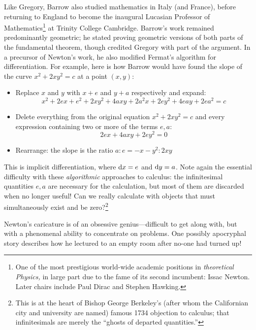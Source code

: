  Like Gregory, Barrow also studied mathematics in Italy (and France), before returning to England to become the inaugural Lucasian Professor of Mathematics\footnote{%
	One of the most prestigious world-wide academic positions in \emph{theoretical Physics,} in large part due to the fame of its second incumbent: Issac Newton. Later chairs include Paul Dirac and Stephen Hawking.%
}
at Trinity College Cambridge. Barrow's work remained predominantly geometric; he stated proving geometric versions of both parts of the fundamental theorem, though credited Gregory with part of the argument. In a precursor of Newton's work, he also modified Fermat's algorithm for differentiation. For example, here is how Barrow would have found the slope of the curve $x^2+2xy^2=c$ at a point $(x,y)$:
\begin{itemize}\itemsep0pt
  \item Replace $x$ and $y$ with $x+e$ and $y+a$ respectively and expand:
  \[
  	x^2+2ex+e^2+2xy^2+4axy+2a^2x+2ey^2+4eay+2ea^2=c
  \]
  \item Delete everything from the original equation $x^2+2xy^2=c$ and every expression containing two or more of the terms $e,a$:
  \[
  	2ex+4axy+2ey^2=0
  \]
  \item Rearrange: the slope is the ratio $a:e=-x-y^2:2xy$
\end{itemize}
This is implicit differentiation, where ${\mathrm{d} x}=e$ and ${\mathrm{d} y}=a$. Note again the essential difficulty with these \emph{algorithmic} approaches to calculus: the infinitesimal quantities $e,a$ are necessary for the calculation, but most of them are discarded when no longer useful! Can we really calculate with objects that must simultaneously exist and be zero?\footnote{This is at the heart of Bishop George Berkeley's (after whom the Californian city and university are named) famous 1734 objection to calculus; that infinitesimals are merely the ``ghosts of departed quantities.''}


% 





Newton's caricature is of an obsessive genius---difficult to get along with, but with a phenomenal ability to concentrate on problems. One possibly apocryphal story describes how he lectured to an empty room after no-one had turned up!\par


